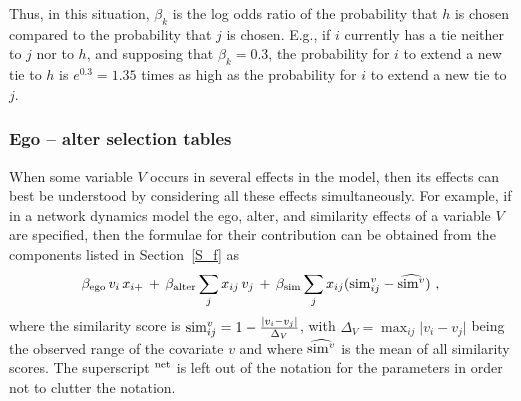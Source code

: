 \documentclass[a4paper,fleqn]{article}
\newcommand{\+}{\, + \,}
\begin{document}
{Thus, in this situation, $\beta_k$ is the log odds ratio of the probability
that $h$ is chosen compared to the probability that $j$ is chosen.
E.g., if $i$ currently has a tie neither to $j$ nor to $h$,
and supposing that $\beta_k = 0.3$, the probability for $i$ to
extend a new tie to $h$ is $e^{0.3} = 1.35$ times as high
as the probability for $i$ to extend a new tie to $j$.

\subsubsection{Ego -- alter selection tables}

When some variable $V$ occurs in several effects in the model,
then its effects can best be understood
by considering all these effects simultaneously.
For example, if in a network dynamics model the
ego, alter, and similarity effects of a variable $V$ are specified,
then the formulae for their contribution can be obtained
from the components listed in Section~\ref{S_f} as
\begin{equation}
 \beta_{\rm ego}\, v_i \, x_{i+} \, + \, \beta_{\rm alter}  \sum_j x_{ij}\, v_j \, + \,
        \beta_{\rm sim}  \sum_j x_{ij} ({\rm sim}^v_{ij} - \widehat{{\rm sim}^v}) \ ,
        \label{eq_contr_V}
\end{equation}
where the similarity score is
${\rm sim}^v_{ij}= 1 - \frac{\vert v_i - v_j \vert}{\Delta_V}$, with
$\Delta_V=\max_{ij}\vert v_i - v_j \vert$ being the observed range of the covariate $v$
and where $\widehat{{\rm sim}^v}$ is the mean of all similarity scores.
The superscript $^{\rm net}$ is left out of the notation for the parameters
in order not to clutter the notation.

}
\end{document}
